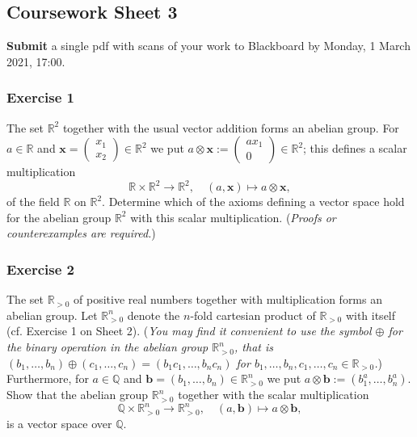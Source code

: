 \documentclass[
  12pt,
  a4paper,
  twoside]{article}
\theoremstyle{plain}
\theoremstyle{definition}
\begin{document}
\hypertarget{coursework-sheet-3}{%
\subsection{Coursework Sheet 3}\label{coursework-sheet-3}}

\textbf{Submit} a single pdf with scans of your work to Blackboard by Monday, 1 March 2021, 17:00.

\hypertarget{exercise-1-3}{%
\subsubsection*{Exercise 1}\label{exercise-1-3}}

The set \(\mathbb{R}^2\) together with the usual vector addition forms an abelian
group. For \(a \in \mathbb{R}\) and \(\mathbf{x} = \left(\begin{array}{c}x_1\\x_2\end{array}\right) \in \mathbb{R}^2\) we
put
\(a \otimes \mathbf{x} := \left(\begin{array}{c} ax_1\\ 0\end{array}\right) \in \mathbb{R}^2\);
this defines a scalar multiplication
\[\mathbb{R} \times \mathbb{R}^2 \rightarrow \mathbb{R}^2, \quad (a, \mathbf{x}) \mapsto a
\otimes \mathbf{x},\] of the field \(\mathbb{R}\) on \(\mathbb{R}^2\). Determine
which of the axioms defining a vector space hold for the
abelian group \(\mathbb{R}^2\) with this scalar multiplication.
(\emph{Proofs or counterexamples are required.})

\hypertarget{exercise-2-3}{%
\subsubsection*{Exercise 2}\label{exercise-2-3}}

The set \(\mathbb{R}_{>0}\) of positive real numbers together with
multiplication forms an abelian group. Let \(\mathbb{R}_{>0}^n\) denote
the \(n\)-fold cartesian product of \(\mathbb{R}_{>0}\) with itself (cf.
Exercise 1 on Sheet 2). (\emph{You may find it convenient to use
the symbol \(\oplus\) for the binary operation in the abelian
group \(\mathbb{R}_{>0}^n\), that is \((b_1, \ldots, b_n) \oplus (c_1, \ldots, c_n) = (b_1 c_1, \ldots, b_n c_n)\) for \(b_1, \ldots, b_n, c_1, \ldots, c_n \in \mathbb{R}_{>0}\).}) Furthermore, for \(a \in \mathbb{Q}\) and \(\mathbf{b} = (b_1, \ldots, b_n) \in \mathbb{R}_{>0}^n\) we put
\(a \otimes \mathbf{b} := (b_1^a, \dots, b_n^a)\). Show that the
abelian group \(\mathbb{R}_{>0}^n\) together with the scalar multiplication
\[\mathbb{Q} \times \mathbb{R}_{>0}^n \rightarrow
\mathbb{R}_{>0}^n, \quad (a, \mathbf{b}) \mapsto a \otimes \mathbf{b},\] is a
vector space over \(\mathbb{Q}\).
\end{document}
